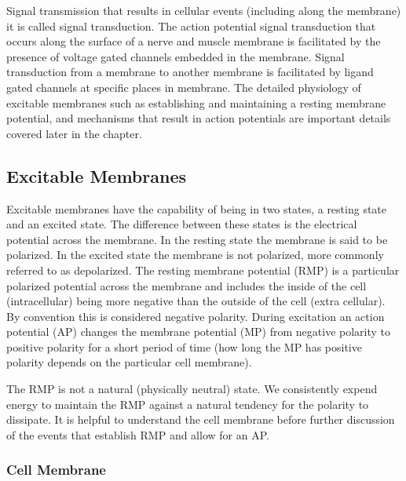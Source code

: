 Signal transmission that results in cellular events (including along the membrane) it is called signal transduction. The action potential signal transduction that occurs along the surface of a nerve and muscle membrane is facilitated by the presence of voltage gated channels embedded in the membrane. Signal transduction from a membrane to another membrane is facilitated by ligand gated channels at specific places in membrane. The detailed physiology of excitable membranes such as establishing and maintaining a resting membrane potential, and mechanisms that result in action potentials are important details covered later in the chapter. 

\subsection{Excitable Membranes}

Excitable membranes have the capability of being in two states, a resting state and an excited state. The difference between these states is the electrical potential across the membrane. In the resting state the membrane is said to be polarized. In the excited state the membrane is not polarized, more commonly referred to as depolarized. The resting membrane potential (RMP) is a particular polarized potential across the membrane and includes the inside of the cell (intracellular) being more negative than the outside of the cell (extra cellular). By convention this is considered negative polarity.\footnotemark{} During excitation an action potential (AP) changes the membrane potential (MP) from negative polarity to positive polarity for a short period of time (how long the MP has positive polarity depends on the particular cell membrane).

The RMP is not a natural (physically neutral) state. We consistently expend energy to maintain the RMP against a natural tendency for the polarity to dissipate. It is helpful to understand the cell membrane before further discussion of the events that establish RMP and allow for an AP.

\subsubsection{Cell Membrane}

